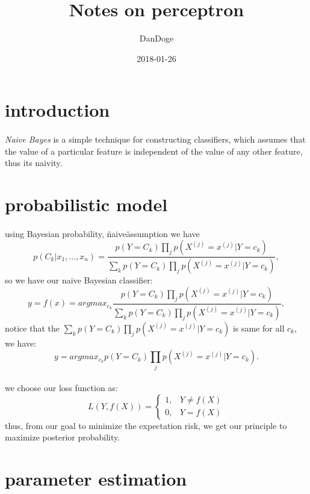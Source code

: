 \documentclass{article}
\title{Notes on perceptron}
\date{2018-01-26}
\author{DanDoge}
\begin{document}
\section{introduction}
  \paragraph{} \textit{Naive Bayes} is a simple technique for constructing classifiers, which assumes that the value of a particular feature is independent of the value of any other feature, thus its naivity.
\section{probabilistic model}
  \paragraph{} using Bayesian probability, \"naive\" assumption we have
  \begin{equation}
    p(C_k|x_1,...,x_n) = \frac{p(Y = C_k)\prod_j p(X^{(j)} = x^{(j)}|Y = c_k)}{\sum_k p(Y = C_k)\prod_j p(X^{(j)} = x^{(j)}|Y = c_k)},
  \end{equation}
  so we have our naive Bayesian classifier:
  \begin{equation}
    y = f(x) = argmax_{c_k}\frac{p(Y = C_k)\prod_j p(X^{(j)} = x^{(j)}|Y = c_k)}{\sum_k p(Y = C_k)\prod_j p(X^{(j)} = x^{(j)}|Y = c_k)},
  \end{equation}
  notice that the $\sum_k p(Y = C_k)\prod_j p(X^{(j)} = x^{(j)}|Y = c_k)$ is same for all $c_k$, we have:
  \begin{equation}
    y = argmax_{c_k}p(Y = C_k)\prod_j p(X^{(j)} = x^{(j)}|Y = c_k).
  \end{equation}
  \paragraph{} we choose our loss function as:
  \begin{equation}
    L(Y, f(X)) =
    \begin{cases}
      1,  & Y \neq f(X) \\
      0,  & Y = f(X)
    \end{cases}
  \end{equation}
  thus, from our goal to minimize the expectation risk, we get our principle to maximize posterior probability.
\section{parameter estimation}
\end{document}
